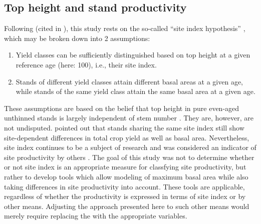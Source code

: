 \subsection{Top height and stand productivity}

Following \textcite{Baur1881} (cited in \textcite[p. 159]{Assmann1970}), this study rests on the so-called “site index hypothesis” \parencite{Skovsgaard2008}, which may be broken down into 2 assumptions:
\begin{enumerate}
\item Yield classes can be sufficiently distinguished based on top height at a given reference age (here: \SI{100}{\year}), i.e., their site index.
\item Stands of different yield classes attain different basal areas at a given age, while stands of the same yield class attain the same basal area at a given age.
\end{enumerate}
These assumptions are based on the belief that top height in pure even-aged unthinned stands is largely independent of stem number \parencite{Skovsgaard2008}.  
They are, however, are not undisputed.  \textcite{Assmann1970} pointed out that stands sharing the same site index still show site-dependent differences in total crop yield as well as basal area.  Nevertheless, site index continues to be a subject of research \parencite{Weiskittel2011,Somarriba2001,Wang2005} and was considered an indicator of site productivity by others \parencite{Monserud1984,Rayner1992,Karlsson1997}.  The goal of this study was not to determine whether or not site index is an appropriate measure for classfying site productivity, but rather to develop tools which allow modeling of maximum basal area while also taking differences in site productivity into account.  These tools are applicable, regardless of whether the productivity is expressed in terms of site index or by other means.  Adjusting the approach presented here to such other means would merely require replacing the \ProductivityIndexVariableText{} with the appropriate variables.

